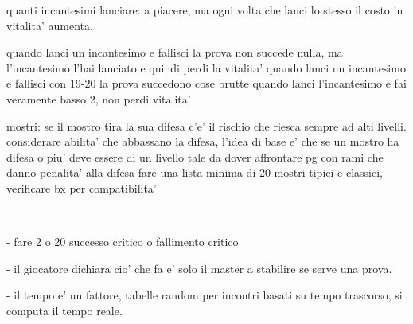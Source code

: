 \documentclass[12pt,a4paper,twoside,openany]{book}
\begin{document}
quanti incantesimi lanciare:  a piacere, ma ogni volta che lanci lo stesso il costo in vitalita' aumenta. 

quando lanci un incantesimo e fallisci la prova non succede nulla, ma l'incantesimo l'hai lanciato e quindi perdi la vitalita' 
quando lanci un incantesimo e fallisci con 19-20 la prova succedono cose  brutte
quando lanci l'incantesimo e fai veramente basso 2, non perdi vitalita'


mostri:
se il mostro tira la sua difesa c'e' il rischio che riesca sempre ad alti livelli. considerare abilita' che abbassano la difesa, l'idea di base e' che se un mostro ha difesa  o piu' deve essere di un livello tale da dover affrontare pg con rami che danno penalita' alla difesa
fare una lista minima di 20 mostri tipici e classici, verificare bx per compatibilita'


--------------------------------------------------------------------------------



- fare 2 o 20  successo critico o fallimento  critico

- il giocatore dichiara cio' che fa e' solo il master a stabilire se serve una prova. 

- il tempo e' un fattore, tabelle random per incontri basati su tempo trascorso, si computa il tempo reale.
\end{document}

